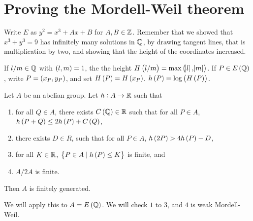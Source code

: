\pagebreak

\section{Proving the Mordell-Weil theorem}


Write $ E $ as $ y^2 = x^3 + Ax + B $ for $ A, B \in \mathbb{Z} $. Remember that we showed that $ x^3 + y^3 = 9 $ has infinitely many solutions in $ \mathbb{Q} $, by drawing tangent lines, that is multiplication by two, and showing that the height of the coordinates increased.

\begin{definition}
If $ l / m \in \mathbb{Q} $ with $ \br{l, m} = 1 $, the the height $ H\br{l / m} = \max\br{\abs{l}, \abs{m}} $. If $ P \in E\br{\Q} $, write $ P = \br{x_P, y_P} $, and set $ H\br{P} = H\br{x_P} $. $ h\br{P} = \log\br{H\br{P}} $.
\end{definition}

\begin{proposition}
Let $ A $ be an abelian group. Let $ h : A \to \mathbb{R} $ such that
\begin{enumerate}
\item for all $ Q \in A $, there exists $ C\br{\Q} \in \R $ such that for all $ P \in A $, $ h\br{P + Q} \le 2h\br{P} + C\br{Q} $,
\item there exists $ D \in R $, such that for all $ P \in A $, $ h\br{2P} > 4h\br{P} - D $,
\item for all $ K \in \mathbb{R} $, $ \cbr{P \in A \mid h\br{P} \le K} $ is finite, and
\item $ A / 2A $ is finite.
\end{enumerate}
Then $ A $ is finitely generated.
\end{proposition}

We will apply this to $ A = E\br{\Q} $. We will check $ 1 $ to $ 3 $, and $ 4 $ is weak Mordell-Weil.


